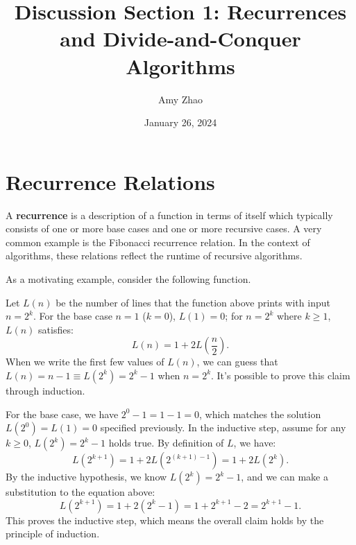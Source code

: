 \documentclass[11pt]{article}
\title{Discussion Section 1: Recurrences and Divide-and-Conquer Algorithms}
\date{January 26, 2024}
\author{Amy Zhao}
\begin{document}
\renewcommand\labelitemi{$\vcenter{\hbox{\tiny$\bullet$}}$}
\renewcommand\labelitemii{$\vcenter{\hbox{\tiny$\bullet$}}$}

\maketitle

\section{Recurrence Relations}
A \textbf{recurrence} is a description of a function in terms of itself which typically consists of one or more base cases and one or more recursive cases. A very common example is the Fibonacci recurrence relation. In the context of algorithms, these relations reflect the runtime of recursive algorithms. 

As a motivating example, consider the following function.

\IncMargin{2em}
\begin{algorithm}[H]
    \footnotesize
    \DontPrintSemicolon
\end{algorithm}\DecMargin{2em} 

Let $L(n)$ be the number of lines that the function above prints with input $n = 2^k$. For the base case $n = 1$ ($k = 0$), $L(1) = 0$; for $n = 2^k$ where $k \geq 1$, $L(n)$ satisfies:
\begin{equation}
    L(n) = 1 + 2L \left(\frac{n}{2}\right).
\end{equation}
When we write the first few values of $L(n)$, we can guess that $L(n) = n - 1 \equiv L(2^k) = 2^k - 1$ when $n = 2^k$. It's possible to prove this claim through induction. 

For the base case, we have $2^0 - 1 = 1 - 1 = 0$, which matches the solution $L(2^0) = L(1) = 0$ specified previously. In the inductive step, assume for any $k \geq 0$, $L(2^k) = 2^k - 1$ holds true. By definition of $L$, we have:
\begin{equation*}
    L(2^{k+1}) = 1 + 2L (2^{(k+1) - 1}) = 1 + 2L(2^k).
\end{equation*}
By the inductive hypothesis, we know $L(2^k) = 2^k - 1$, and we can make a substitution to the equation above:
\begin{equation*}
    L(2^{k+1}) = 1 + 2(2^k - 1)  = 1 + 2^{k+1} - 2 = 2^{k+1} - 1.
\end{equation*}
This proves the inductive step, which means the overall claim holds by the principle of induction. 
\end{document}

